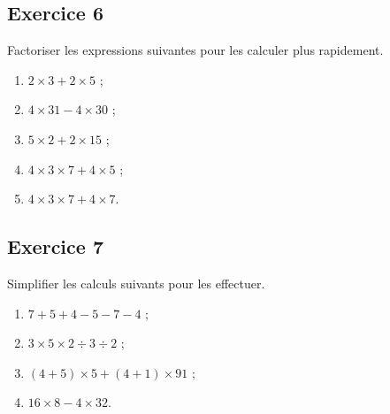 \documentclass[12 pt]{extarticle}
\theoremstyle{plain}
\begin{document}
\subsection*{Exercice 6}

Factoriser les expressions suivantes pour les calculer plus rapidement. \begin{enumerate}
\item $ 2 \times 3 + 2 \times 5$ ;
\item $ 4 \times 31 - 4 \times 30 $ ;
\item $ 5 \times 2 + 2 \times 15$ ;
\item $ 4 \times 3 \times 7 + 4 \times 5$ ;
\item $ 4 \times 3 \times 7 + 4 \times 7$.
\end{enumerate}

\subsection*{Exercice 7}

Simplifier les calculs suivants pour les effectuer.

\begin{enumerate}
\item $ 7 + 5 + 4 - 5 - 7 - 4$ ; 
\item $ 3 \times 5 \times 2 \div 3 \div 2$ ;
\item $ (4 + 5) \times 5 + (4+1) \times 91$ ;
\item $ 16 \times 8 - 4 \times 32$.

\end{enumerate}


 	
\end{document}

